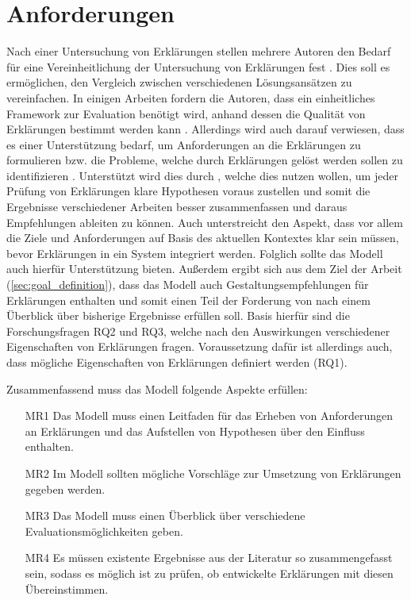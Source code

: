 \section{Anforderungen}

Nach einer Untersuchung von Erklärungen stellen mehrere Autoren den Bedarf für eine Vereinheitlichung der Untersuchung von Erklärungen fest \cite{cirqueira_scenario-based_2020,zahedi_towards_2019, nunes_systematic_2017, martin_evaluating_2021}. Dies soll es ermöglichen, den Vergleich zwischen verschiedenen Lösungsansätzen zu vereinfachen. In einigen Arbeiten fordern die Autoren, dass ein einheitliches Framework zur Evaluation benötigt wird, anhand dessen die Qualität von Erklärungen bestimmt werden kann \cite{nunes_systematic_2017,sokol_explainability_2020,chari_explanation_2020}. Allerdings wird auch darauf verwiesen, dass es einer Unterstützung bedarf, um Anforderungen an die Erklärungen zu formulieren bzw. die Probleme, welche durch Erklärungen gelöst werden sollen zu identifizieren \cite{chazette_end-users_nodate, doshi2017towards}. Unterstützt wird dies durch \citeauthor{waa_evaluating_2021}, welche dies nutzen wollen, um jeder Prüfung von Erklärungen klare Hypothesen voraus zustellen und somit die Ergebnisse verschiedener Arbeiten besser zusammenfassen und daraus Empfehlungen ableiten zu können. Auch \citeauthor{kohl_explainability_2019} unterstreicht den Aspekt, dass vor allem die Ziele und Anforderungen auf Basis des aktuellen Kontextes klar sein müssen, bevor Erklärungen in ein System integriert werden. Folglich sollte das Modell auch hierfür Unterstützung bieten. Außerdem ergibt sich aus dem Ziel der Arbeit (\autoref{sec:goal_definition}), dass das Modell auch Gestaltungsempfehlungen für Erklärungen enthalten und somit einen Teil der Forderung von \citeauthor{waa_evaluating_2021} nach einem Überblick über bisherige Ergebnisse erfüllen soll. Basis hierfür sind die Forschungsfragen RQ2 und RQ3, welche nach den Auswirkungen verschiedener Eigenschaften von Erklärungen fragen. Voraussetzung dafür ist allerdings auch, dass mögliche Eigenschaften von Erklärungen definiert werden (RQ1).

Zusammenfassend muss das Modell folgende Aspekte erfüllen:

\begin{enumerate}
    \item[MR1] Das Modell muss einen Leitfaden für das Erheben von Anforderungen an Erklärungen und das Aufstellen von Hypothesen über den Einfluss enthalten.
    \item[MR2] Im Modell sollten mögliche Vorschläge zur Umsetzung von Erklärungen gegeben werden.
    \item[MR3] Das Modell muss einen Überblick über verschiedene Evaluationsmöglichkeiten geben.
    \item[MR4] Es müssen existente Ergebnisse aus der Literatur so zusammengefasst sein, sodass es möglich ist zu prüfen, ob entwickelte Erklärungen mit diesen Übereinstimmen.
\end{enumerate}

